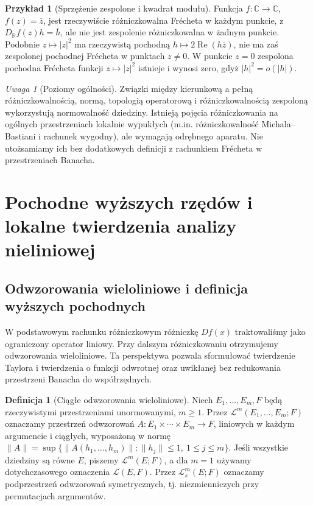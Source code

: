 \documentclass[11pt,a4paper]{article}
\numberwithin{equation}{section}
\theoremstyle{plain}
\theoremstyle{definition}
\newtheorem{definicja}[twierdzenie]{Definicja}
\newtheorem{przyklad}[twierdzenie]{Przykład}
\theoremstyle{remark}
\newtheorem{uwaga}[twierdzenie]{Uwaga}
\newcommand{\R}{\mathbb R}
\newcommand{\C}{\mathbb C}
\begin{document}
\begin{przyklad}[Sprzężenie zespolone i kwadrat modułu]
\label{ex:complex-nonholomorphic14}
Funkcja $f:\C\to\C$, $f(z)=\overline z$, jest rzeczywiście różniczkowalna Frécheta w każdym punkcie, z $D_{\R}f(z)h=\overline h$, ale nie jest zespolenie różniczkowalna w żadnym punkcie. Podobnie $z\mapsto|z|^2$ ma rzeczywistą pochodną $h\mapsto2\operatorname{Re}(h\overline z)$, nie ma zaś zespolonej pochodnej Frécheta w punktach $z\ne0$. W punkcie $z=0$ zespolona pochodna Frécheta funkcji $z\mapsto|z|^2$ istnieje i wynosi zero, gdyż $|h|^2=o(|h|)$.
\end{przyklad}

\begin{uwaga}[Poziomy ogólności]
Związki między kierunkową a pełną różniczkowalnością, normą, topologią operatorową i różniczkowalnością zespoloną wykorzystują normowalność dziedziny. Istnieją pojęcia różniczkowania na ogólnych przestrzeniach lokalnie wypukłych (m.in. różniczkowalność Michala--Bastiani i rachunek wygodny), ale wymagają odrębnego aparatu. Nie utożsamiamy ich bez dodatkowych definicji z rachunkiem Frécheta w przestrzeniach Banacha.
\end{uwaga}


\setcounter{section}{14}
\section{Pochodne wyższych rzędów i lokalne twierdzenia analizy nieliniowej}
\label{sec:wyzsze-pochodne15}

\subsection{Odwzorowania wieloliniowe i definicja wyższych pochodnych}

W podstawowym rachunku różniczkowym różniczkę $Df(x)$ traktowaliśmy jako ograniczony operator liniowy. Przy dalszym różniczkowaniu otrzymujemy odwzorowania wieloliniowe. Ta perspektywa pozwala sformułować twierdzenie Taylora i twierdzenia o funkcji odwrotnej oraz uwikłanej bez redukowania przestrzeni Banacha do współrzędnych.

\begin{definicja}[Ciągłe odwzorowania wieloliniowe]
\label{def:multilinear15}
Niech $E_1,\ldots,E_m,F$ będą rzeczywistymi przestrzeniami unormowanymi, $m\ge1$. Przez $\mathcal L^m(E_1,\ldots,E_m;F)$ oznaczamy przestrzeń odwzorowań $A:E_1\times\cdots\times E_m\to F$, liniowych w każdym argumencie i ciągłych, wyposażoną w normę
$\|A\|=\sup\{\|A(h_1,\ldots,h_m)\|:\|h_j\|\le1,\ 1\le j\le m\}$. Jeśli wszystkie dziedziny są równe $E$, piszemy $\mathcal L^m(E;F)$, a dla $m=1$ używamy dotychczasowego oznaczenia $\mathcal L(E,F)$. Przez $\mathcal L^m_s(E;F)$ oznaczamy podprzestrzeń odwzorowań symetrycznych, tj. niezmienniczych przy permutacjach argumentów.
\end{definicja}
\end{document}
